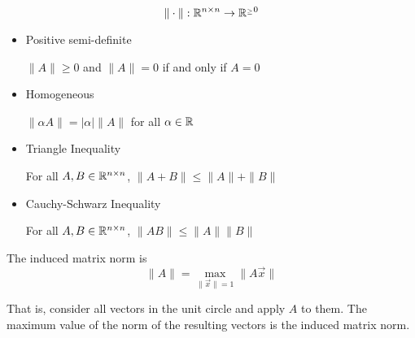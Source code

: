 \begin{remark}
    \[
        \| \cdot \|: \mathbb{R}^{n \times n} \to \mathbb{R}^{_\geq 0}
    \]

    \begin{itemize}
        \item Positive semi-definite

              \( \| A \| \geq 0 \) and \( \| A \| = 0 \) if and only if \( A = 0 \)

        \item Homogeneous

              \( \| \alpha A \| = | \alpha | \| A \| \) for all \( \alpha \in \mathbb{R} \)

        \item Triangle Inequality

              For all \( A, B \in \mathbb{R}^{n \times n} \), \( \| A + B \| \leq \| A \| + \| B \| \)

        \item Cauchy-Schwarz Inequality

              For all \( A, B \in \mathbb{R}^{n \times n} \), \( \| AB \| \leq \| A \| \| B \| \)
    \end{itemize}

    The induced matrix norm is \[
        \| A \| = \max_{\| \vec{x} \| = 1} \| A \vec{x} \|
    \]

    That is, consider all vectors in the unit circle and apply \( A \) to them. The maximum value of the norm of the resulting vectors is the induced matrix norm.

    \begin{figure}[H]
        \centering
    \end{figure}


\end{remark}

